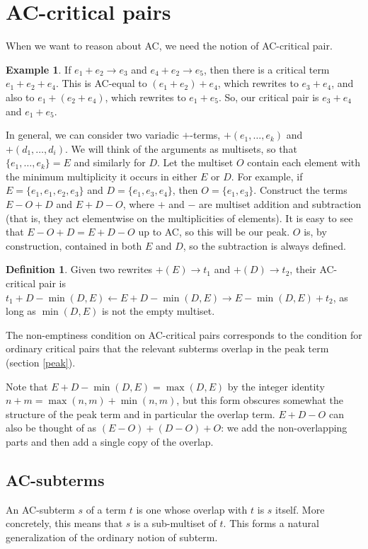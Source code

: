 \documentclass[12pt,a4paper,twoside,openright]{report}
\numberwithin{equation}{chapter}		%
\numberwithin{figure}{chapter}			%
\numberwithin{table}{chapter}			%
\theoremstyle{definition}
\newtheorem*{ex}{Example}
\newtheorem*{definition}{Definition}
\theoremstyle{plain}
\begin{document}
\section{AC-critical pairs} \label{accrit}
When we want to reason about AC, we need the notion of AC-critical pair.

\begin{ex}
If $e_1 + e_2 \rightarrow e_3$ and $e_4 + e_2 \rightarrow e_5$, then there is a critical term $e_1 + e_2 + e_4$. This is AC-equal to $(e_1 + e_2) + e_4$, which rewrites to $e_3 + e_4$, and also to $e_1 + (e_2 + e_4)$, which rewrites to $e_1 + e_5$. So, our critical pair is $e_3 + e_4$ and $e_1 + e_5$.
\end{ex}

In general, we can consider two variadic $+$-terms, $+(e_1, \ldots, e_k)$ and $+(d_1, \ldots, d_i)$. We will think of the arguments as multisets, so that $\{e_1, \ldots, e_k\} = E$ and similarly for $D$. Let the multiset $O$ contain each element with the minimum multiplicity it occurs in either $E$ or $D$. For example, if $E = \{e_1, e_1, e_2, e_3\}$ and $D = \{e_1, e_3, e_4\}$, then $O = \{e_1, e_3\}$. Construct the terms $E - O + D$ and $E + D - O$, where $+$ and $-$ are multiset addition and subtraction (that is, they act elementwise on the multiplicities of elements). It is easy to see that $E - O + D = E + D - O$ up to AC, so this will be our peak. $O$ is, by construction, contained in both $E$ and $D$, so the subtraction is always defined.

\begin{definition}
	Given two rewrites $+(E) \rightarrow t_1$ and $+(D) \rightarrow t_2$, their AC-critical pair is
	$t_1 + D - \min(D, E) \leftarrow E + D - \min(D, E) \rightarrow E - \min(D, E) + t_2$, as long as $\min(D, E)$ is not the empty multiset.
\end{definition}

The non-emptiness condition on AC-critical pairs corresponds to the condition for ordinary critical pairs that the relevant subterms overlap in the peak term (section \ref{peak}).

Note that $E + D - \min(D, E) = \max(D, E)$ by the integer identity $n + m = \max(n, m) + \min(n, m)$, but this form obscures somewhat the structure of the peak term and in particular the overlap term. $E + D - O$ can also be thought of as $(E - O) + (D - O) + O$: we add the non-overlapping parts and then add a single copy of the overlap.

\subsection{AC-subterms}
An AC-subterm $s$ of a term $t$ is one whose overlap with $t$ is $s$ itself. More concretely, this means that $s$ is a sub-multiset of $t$. This forms a natural generalization of the ordinary notion of subterm.
\end{document}
